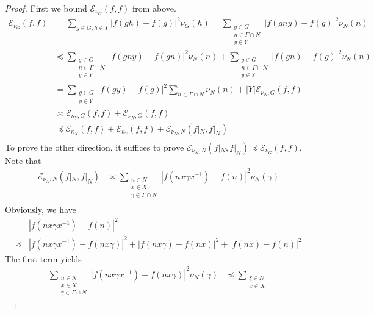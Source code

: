 \documentclass[pdflatex,sn-mathphys-num]{sn-jnl}%
\theoremstyle{thmstyleone}%
\theoremstyle{thmstyletwo}%
\theoremstyle{thmstylethree}%
\begin{document}
\begin{proof} First we bound $\mathcal{E}_{\nu_G}(f,f)$ from above.
    \begin{align*}
        \mathcal{E}_{\nu_G}(f,f) & = \sum_{g \in G, h\in \Gamma} |f(gh) - f(g)|^2 \nu_G(h)  = \sum_{\substack{g \in G\\n \in \Gamma \cap N\\ y\in Y}}  |f(gny) - f(g)|^2 \nu_N(n)\\
        &\preccurlyeq \sum_{\substack{g \in G\\n \in \Gamma \cap N\\ y\in Y}}  |f(gny) - f(gn)|^2 \nu_N(n) + \sum_{\substack{g \in G\\n \in \Gamma \cap N\\ y\in Y}}  |f(gn) - f(g)|^2 \nu_N(n)\\
        & = \sum_{\substack{g \in G\\ y\in Y}}  |f(gy) - f(g)|^2 \sum_{n \in \Gamma \cap N}\nu_N(n) + |Y|\mathcal{E}_{\nu_N, G}(f,f)\\
        &\asymp \mathcal{E}_{\kappa_Y, G}(f,f) + \mathcal{E}_{\nu_N, G}(f,f)\\
        & \preccurlyeq \mathcal{E}_{\kappa_X} (f,f) + \mathcal{E}_{\kappa_Y}(f,f)   + \mathcal{E}_{\nu_N, N}(f|_N,f|_N)  \\
    \end{align*}
To prove the other direction, it suffices to prove $\mathcal{E}_{\nu_N, N}(f|_N,f|_N) \preccurlyeq \mathcal{E}_{\nu_G} (f,f) $.  
Note that
\begin{align*}
    \mathcal{E}_{\nu_{N}, N}(f|_N,f|_N) & \asymp \sum_{\substack{n\in N\\ x \in X \\ \gamma \in \Gamma \cap N\\}} |f(n x \gamma x^{-1}) - f(n)|^2\nu_N(\gamma)
\end{align*}
Obviously, we have
\begin{align*}
   & |f(n x\gamma  x^{-1}) - f(n)|^2 \\
     \preccurlyeq & |f(n x\gamma  x^{-1}) 
 -f(n x\gamma  ) |^2 + |f(n x\gamma  ) - f(nx)|^2 + |f(nx) - f(n)|^2
\end{align*}
The first term yields
\begin{align*}
    \sum_{\substack{n\in N\\ x \in X \\ \gamma \in \Gamma \cap N}}  |f(n x\gamma  x^{-1}) 
 -f(n x\gamma  ) |^2 \nu_N(\gamma) 
& \preccurlyeq\sum_{\substack{\xi\in N\\ x \in X }}  

\end{align*}
\end{proof}
\end{document}
